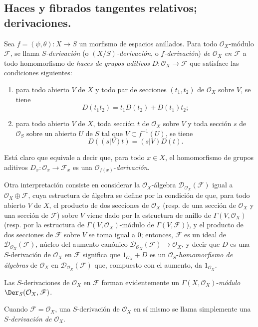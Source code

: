 \subsection{Haces y fibrados tangentes relativos; derivaciones.}
\label{IV.16.5}

\begin{env}[16.5.1]
\label{IV.16.5.1}
Sea $f=(\psi,\theta):X\to S$ un morfismo de espacios anillados. Para todo
$\mathcal{O}_X$-módulo $\mathscr{F}$, se llama \emph{$S$-derivación}
(o \emph{$(X/S)$-derivación}, o \emph{$f$-derivación}) \emph{de
$\mathcal{O}_X$ en $\mathscr{F}$} a todo homomorfismo de \emph{haces de
grupos aditivos} $D:\mathcal{O}_X\to\mathscr{F}$ que satisface las condiciones
siguientes:
\begin{enumerate}
\item[\emph{a)}] para todo abierto $V$ de $X$ y todo par de secciones
$(t_1,t_2)$ de $\mathcal{O}_X$ sobre $V$, se tiene
\[
  D(t_1t_2)=t_1D(t_2)+D(t_1)t_2;
  \tag{16.5.1.1}
  \label{IV.16.5.1.1}
\]
\item[\emph{b)}] para todo abierto $V$ de $X$, toda sección $t$ de $\mathcal{O}_X$
sobre $V$ y toda sección $s$ de $\mathcal{O}_S$ sobre un abierto
$U$ de $S$ tal que $V\subset f^{-1}(U)$, se tiene
\[
  D((s|V)t)=(s|V)D(t).
  \tag{16.5.1.2}
  \label{IV.16.5.1.2}
\]
\end{enumerate}
Está claro que equivale a decir que, para todo $x\in X$,
el homomorfismo de grupos aditivos
$D_x:\mathcal{O}_x\to\mathscr{F}_x$ es una
$\mathcal{O}_{f(x)}$-\emph{derivación}.

Otra interpretación consiste en considerar la $\mathcal{O}_X$-álgebra
$\mathscr{D}_{\mathcal{O}_X}(\mathscr{F})$ igual a
$\mathcal{O}_X\oplus\mathscr{F}$, cuya estructura de álgebra se define por la
condición de que, para todo abierto $V$ de $X$, el producto de dos secciones de
$\mathcal{O}_X$ (resp. de una sección de $\mathcal{O}_X$ y una sección de
$\mathscr{F}$) sobre $V$ viene dado por la estructura de anillo de
$\Gamma(V,\mathcal{O}_X)$ (resp. por la estructura de
$\Gamma(V,\mathcal{O}_X)$-módulo de $\Gamma(V,\mathscr{F})$), y el producto de
dos secciones de $\mathscr{F}$ sobre $V$ se toma igual a 0; entonces,
$\mathscr{F}$ es un ideal de
$\mathscr{D}_{\mathcal{O}_X}(\mathscr{F})$, núcleo del aumento canónico
$\mathscr{D}_{\mathcal{O}_X}(\mathscr{F})\to\mathcal{O}_X$, y decir que $D$
es una $S$-derivación de $\mathcal{O}_X$ en $\mathscr{F}$ significa que
$1_{\mathcal{O}_X}+D$ es un $\mathcal{O}_S$-\emph{homomorfismo de álgebras} de
$\mathcal{O}_X$ en $\mathscr{D}_{\mathcal{O}_X}(\mathscr{F})$ que, compuesto
con el aumento, da $1_{\mathcal{O}_X}$.

Las $S$-derivaciones de $\mathcal{O}_X$ en $\mathscr{F}$ forman evidentemente
un $\Gamma(X,\mathcal{O}_X)$-\emph{módulo}
$\Der_S(\mathcal{O}_X,\mathscr{F})$.

Cuando $\mathscr{F}=\mathcal{O}_X$, una $S$-derivación de $\mathcal{O}_X$ en
sí mismo se llama simplemente una \emph{$S$-derivación de $\mathcal{O}_X$}.
\end{env}

